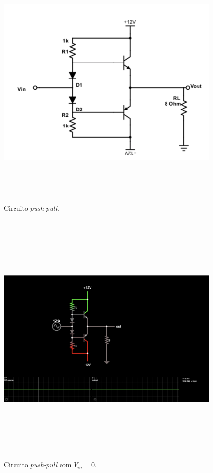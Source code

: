 \documentclass{article}
\begin{document}
        
    \nocite{*}
    
    

    \begin{figure}[!h]
        \centering
        \includegraphics[width=13cm,height=13cm,keepaspectratio]{imagens/circ1.png}
        \caption{Circuito \emph{push-pull}.}
        \label{fig:push-pull}
    \end{figure}

    \begin{figure}[!h]
        \centering
        \includegraphics[width=13cm,height=13cm,keepaspectratio]{imagens/vin0.png}
        \caption{Circuito \emph{push-pull} com $V_{in} = 0$.}
        \label{fig:vin0}
    \end{figure}
\end{document}
